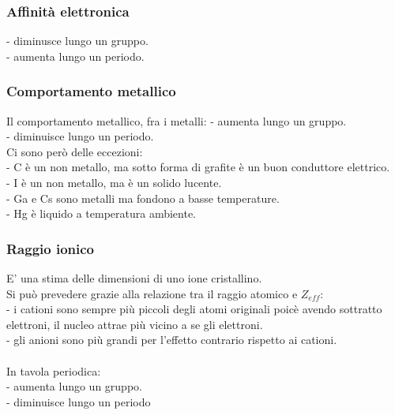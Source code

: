 \subsubsection{Affinità elettronica}
- diminusce lungo un gruppo.\\
- aumenta lungo un periodo.
\subsubsection{Comportamento metallico}
Il comportamento metallico, fra i metalli:
- aumenta lungo un gruppo.\\
- diminuisce lungo un periodo.\\
Ci sono però delle eccezioni:\\
- C è un non metallo, ma sotto forma di grafite è un buon conduttore elettrico.\\
- I è un non metallo, ma è un solido lucente.\\
- Ga e Cs sono metalli ma fondono a basse temperature.\\
- Hg è liquido a temperatura ambiente.
\subsubsection{Raggio ionico}
E' una stima delle dimensioni di uno ione cristallino.\\
Si può prevedere grazie alla relazione tra il raggio atomico e $Z_{eff}$:\\
- i cationi sono sempre più piccoli degli atomi originali poicè avendo sottratto elettroni, il nucleo attrae più vicino a se gli elettroni.\\
- gli anioni sono più grandi per l'effetto contrario rispetto ai cationi.\\\\
In tavola periodica:\\
- aumenta lungo un gruppo.\\
- diminuisce lungo un periodo
